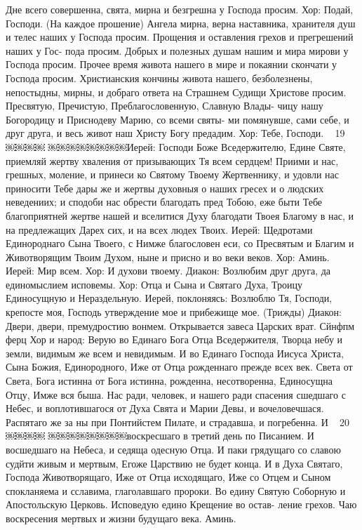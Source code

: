 Дне всего совершенна, свята, мирна и безгрешна у Господа просим.
Хор: Подай, Господи. (На каждое прошение)
Ангела мирна, верна наставника, хранителя душ и телес наших у Господа просим.
Прощения и оставления грехов и прегрешений наших у Гос- пода просим.
Добрых и полезных душам нашим и мира мирови у Господа просим.
Прочее время живота нашего в мире и покаянии скончати у Господа просим.
Христианския кончины живота нашего, безболезнены, непостыдны, мирны, и добраго ответа на Страшнем Судищи Христове просим.
Пресвятую, Пречистую, Преблагословенную, Славную Влады- чицу нашу Богородицу и Приснодеву Марию, со всеми святы- ми помянувше, сами себе, и друг друга, и весь живот наш Христу Богу предадим.
Хор: Тебе, Господи.
~ 19 ~
￼￼￼￼
￼￼￼￼￼￼￼￼Иерей: Господи Боже Вседержителю, Едине Святе, приемляй жертву хваления от призывающих Тя всем сердцем! Приими и нас, грешных, моление, и принеси ко Святому Твоему Жертвеннику, и удовли нас приносити Тебе дары же и жертвы духовныя о наших гресех и о людских неведениих; и сподоби нас обрести благодать пред Тобою, еже быти Тебе благоприятней жертве нашей и вселитися Духу благодати Твоея Благому в нас, и на предлежащих Дарех сих, и на всех людех Твоих.
Иерей: Щедротами Единороднаго Сына Твоего, с Нимже благословен еси, со Пресвятым и Благим и Животворящим Твоим Духом, ныне и присно и во веки веков.
Хор: Аминь.
Иерей: Мир всем.
Хор: И духови твоему.
Диакон: Возлюбим друг друга, да единомыслием исповемы. Хор: Отца и Сына и Святаго Духа, Троицу Единосущную и
Нераздельную.
Иерей, поклоняясь: Возлюблю Тя, Господи, крепосте моя, Господь утверждение мое и прибежище мое. (Трижды)
Диакон: Двери, двери, премудростию вонмем. Открывается завеса Царских врат.
Сйнфпм ферц
Хор и народ: Верую во Единаго Бога Отца Вседержителя, Творца небу и земли, видимым же всем и невидимым. И во Единаго Господа Иисуса Христа, Сына Божия, Единородного, Иже от Отца рожденнаго прежде всех век. Света от Света, Бога истинна от Бога истинна, рожденна, несотворенна, Единосущна Отцу, Имже вся быша. Нас ради, человек, и нашего ради спасения сшедшаго с Небес, и воплотившагося от Духа Свята и Марии Девы, и вочеловечшася. Распятаго же за ны при Понтийстем Пилате, и страдавша, и погребенна. И
~ 20 ~
￼￼￼￼
￼￼￼￼￼￼￼￼воскресшаго в третий день по Писанием. И восшедшаго на Небеса, и седяща одесную Отца. И паки грядущаго со славою судйти живым и мертвым, Егоже Царствию не будет конца. И в Духа Святаго, Господа Животворящаго, Иже от Отца исходящаго, Иже со Отцем и Сыном спокланяема и сславима, глаголавшаго пророки. Во едину Святую Соборную и Апостольскую Церковь. Исповедую едино Крещение во остав- ление грехов. Чаю воскресения мертвых и жизни будущаго века. Аминь.
